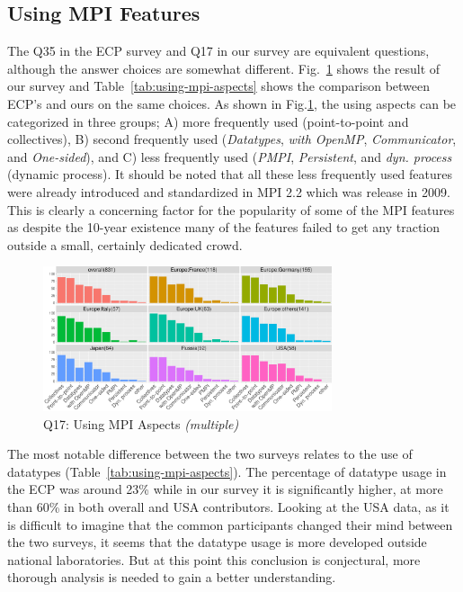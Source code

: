 \documentclass[preprint,5p,times]{elsarticle}
\def\myquote#1{{\it #1}}
\begin{document}
\subsection{Using MPI Features}\label{sec:mpi-aspects}

The Q35 in the ECP survey and Q17 in our survey are equivalent
questions, although the answer choices are somewhat
different. Fig.~\ref{fig:using-mpi-aspects} shows the result of our
survey and Table~\ref{tab:using-mpi-aspects} shows the comparison
between ECP's and ours on the same choices. As shown in
Fig.\ref{fig:using-mpi-aspects}, the
using aspects can be categorized in three groups; A) more frequently
used (point-to-point and collectives), B) second frequently used
(\myquote{Datatypes}, \myquote{with OpenMP}, \myquote{Communicator}, and \myquote{One-sided}), and C) less
frequently used (\myquote{PMPI}, \myquote{Persistent}, and
\myquote{dyn. process} (dynamic process).
%
It should be noted that all these less frequently used features were already
introduced and standardized in MPI 2.2 which was release in 2009. This is
clearly a concerning factor for the popularity of some of the MPI features as
despite the 10-year existence many of the features failed to get any traction
outside a small, certainly dedicated crowd.

\begin{figure}[htb]
  \begin{center}
    \includegraphics[width=8.5cm]{R-scripts/Q17.pdf}
    \caption{Q17: Using MPI Aspects {\it(multiple)}}
    \label{fig:using-mpi-aspects}
  \end{center}
\end{figure}

The most notable difference between the two surveys relates to the use of
datatypes (Table~\ref{tab:using-mpi-aspects}). The percentage of datatype usage
in the ECP was around 23\% while in our survey it is significantly higher, at
more than 60\% in both overall and USA contributors.
%
Looking at the USA data, as it is difficult to imagine that the common
participants changed their mind between the two surveys, it seems that the
datatype usage is more developed outside national laboratories. But at this
point this conclusion is conjectural, more thorough analysis is needed to gain a
better understanding.
\end{document}
